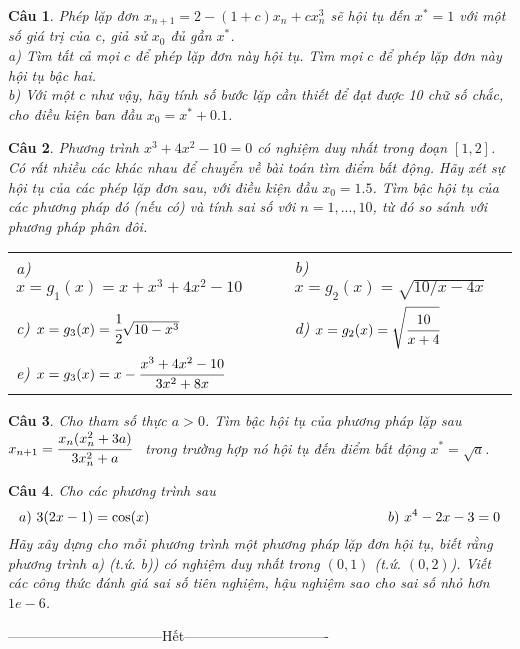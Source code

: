 \documentclass[11pt]{article}
\newtheorem{bt}{Câu}
\begin{document}
\begin{bt} %
Phép lặp đơn $x_{n+1}=2-(1+c)x_n+cx_n^3$ sẽ hội tụ đến $x^*=1$ với một số giá trị của c, giả sử $x_0$ đủ gần $x^*$. \\
a) Tìm tất cả mọi $c$ để phép lặp đơn này hội tụ. Tìm mọi $c$ để phép lặp đơn này hội tụ bậc hai. \\
b) Với một $c$ như vậy, hãy tính số bước lặp cần thiết để đạt được 10 chữ số chắc, cho điều kiện ban đầu $x_0=x^* + 0.1$.  
\end{bt}

\begin{bt} 
Phương trình $x^3+4x^2-10=0$ có nghiệm duy nhất trong đoạn $[1, 2]$. Có rất nhiều các khác nhau để chuyển về bài toán tìm điểm bất động. Hãy xét sự hội tụ của các phép lặp đơn sau, với điều kiện đầu $x_0=1.5$. Tìm bậc hội tụ của các phương pháp đó (nếu có) và tính sai số với $n=1,...,10$, từ đó so sánh với phương pháp phân đôi.\\
%
\begin{tabular}{lll}
a) $x=g_1(x)=x+x^3+4x^2-10$	&  & b) $x=g_2(x) = \sqrt{10/x - 4x}$ \\ 
c) $x=g_3(x)=\cfrac{1}{2}\sqrt{10-x^3}$	&  &  d) $x=g_2(x) = \sqrt{\cfrac{10}{x+4}}$ \\ 
e) $x=g_3(x)=x-\cfrac{x^3+4x^2-10}{3x^2+8x}$	&  &  \\ 
\end{tabular} 
%	
\end{bt}

\begin{bt} %
Cho tham số thực $a>0$. Tìm bậc hội tụ của phương pháp lặp sau  $x_{n+1}=\cfrac{x_n(x_n^2+3a)}{3x_n^2+a}$ \ trong trường hợp nó hội tụ đến điểm bất động $x^* = \sqrt{a}$.
\end{bt}

\begin{bt}
Cho các phương trình sau
%
\[ a) \ 3(2x-1)= \cos(x) \hskip 6cm b) \ x^4-2x-3=0  \]
%
Hãy xây dựng cho mỗi phương trình một phương pháp lặp đơn hội tụ, biết rằng phương trình a) (t.ứ. b)) có nghiệm duy nhất trong $(0,1)$ (t.ứ. $(0,2)$). Viết các công thức đánh giá sai số tiên nghiệm, hậu nghiệm sao cho sai số nhỏ hơn $1e-6$.
\end{bt}

\centerline{———————————Hết——————————-}
\end{document}

